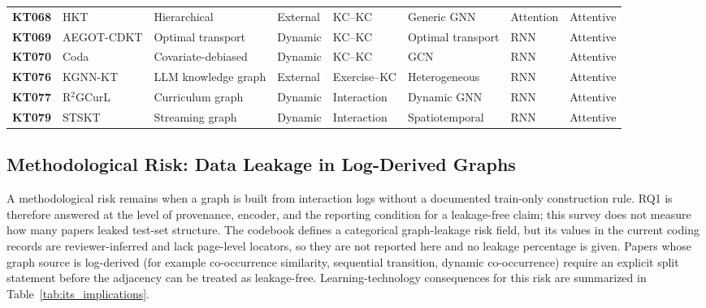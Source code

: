 \documentclass[lettersize,journal]{IEEEtran}
\begin{document}
\begin{table}[t]
\begin{tabular}{@{}ll>{\raggedright\arraybackslash}p{2.15cm}l>{\raggedright\arraybackslash}p{1.55cm}lll@{}}
\textbf{KT068} & HKT \cite{KT068_HKT_2025} & Hierarchical & External & KC--KC & Generic GNN & Attention & Attentive \\
\textbf{KT069} & AEGOT-CDKT \cite{KT069_AEGOTCDKT_2025} & Optimal transport & Dynamic & KC--KC & Optimal transport & RNN & Attentive \\
\textbf{KT070} & Coda \cite{KT070_Coda_2025} & Covariate-debiased & Dynamic & KC--KC & GCN & RNN & Attentive \\
\textbf{KT076} & KGNN-KT \cite{KT076_KGNNKT_2025} & LLM knowledge graph & External & Exercise--KC & Heterogeneous & RNN & Attentive \\
\textbf{KT077} & R$^2$GCurL \cite{KT077_R2GCurL_2026} & Curriculum graph & Dynamic & Interaction & Dynamic GNN & RNN & Attentive \\
\textbf{KT079} & STSKT \cite{KT079_STGSKT_2026} & Streaming graph & Dynamic & Interaction & Spatiotemporal & RNN & Attentive \\
\bottomrule
\end{tabular}
\end{table}

\subsection{Methodological Risk: Data Leakage in Log-Derived Graphs}
A methodological risk remains when a graph is built from interaction logs without a documented train-only construction rule. RQ1 is therefore answered at the level of provenance, encoder, and the reporting condition for a leakage-free claim; this survey does not measure how many papers leaked test-set structure. The codebook defines a categorical graph-leakage risk field, but its values in the current coding records are reviewer-inferred and lack page-level locators, so they are not reported here and no leakage percentage is given. Papers whose graph source is log-derived (for example co-occurrence similarity, sequential transition, dynamic co-occurrence) require an explicit split statement before the adjacency can be treated as leakage-free. Learning-technology consequences for this risk are summarized in Table~\ref{tab:its_implications}.
\end{document}
